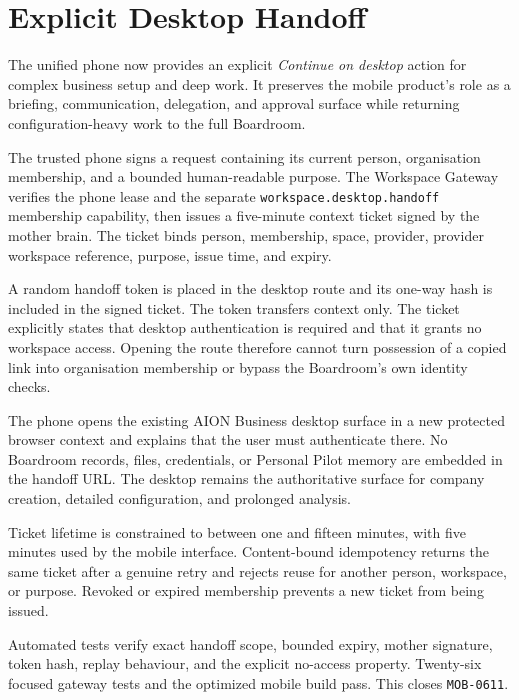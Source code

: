 \section{Explicit Desktop Handoff}
\label{sec:pilot-mobile-desktop-handoff}
\raggedright

The unified phone now provides an explicit \emph{Continue on desktop} action for complex business
setup and deep work.  It preserves the mobile product's role as a briefing, communication,
delegation, and approval surface while returning configuration-heavy work to the full Boardroom.

The trusted phone signs a request containing its current person, organisation membership, and a
bounded human-readable purpose.  The Workspace Gateway verifies the phone lease and the separate
\texttt{workspace.desktop.handoff} membership capability, then issues a five-minute context ticket
signed by the mother brain.  The ticket binds person, membership, space, provider, provider
workspace reference, purpose, issue time, and expiry.

A random handoff token is placed in the desktop route and its one-way hash is included in the signed
ticket.  The token transfers context only.  The ticket explicitly states that desktop
authentication is required and that it grants no workspace access.  Opening the route therefore
cannot turn possession of a copied link into organisation membership or bypass the Boardroom's own
identity checks.

The phone opens the existing AION Business desktop surface in a new protected browser context and
explains that the user must authenticate there.  No Boardroom records, files, credentials, or
Personal Pilot memory are embedded in the handoff URL.  The desktop remains the authoritative
surface for company creation, detailed configuration, and prolonged analysis.

Ticket lifetime is constrained to between one and fifteen minutes, with five minutes used by the
mobile interface.  Content-bound idempotency returns the same ticket after a genuine retry and
rejects reuse for another person, workspace, or purpose.  Revoked or expired membership prevents a
new ticket from being issued.

Automated tests verify exact handoff scope, bounded expiry, mother signature, token hash, replay
behaviour, and the explicit no-access property.  Twenty-six focused gateway tests and the optimized
mobile build pass.  This closes \texttt{MOB-0611}.
